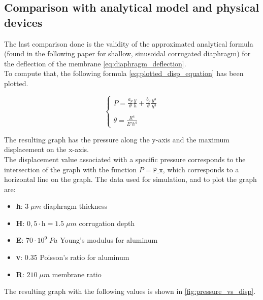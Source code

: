 \subsection{Comparison with analytical model and physical devices}

The last comparison done is the validity of the approximated analytical formula (found in the following paper \cite[p.~988-989]{jerman1986} for shallow, sinusoidal corrugated diaphragm) for the deflection of the membrane \cref{eq:diaphragm_deflection}. \\
To compute that, the following formula \cref{eq:plotted_disp_equation} has been plotted.

\begin{equation}
     \begin{cases}
        P = \frac{a_p}{\theta} \frac{y}{h} + \frac{b_p}{\theta} \frac{y^3}{h^3} \\
        \\
        \theta = \frac{R^4}{E'h^4}
    \end{cases}
    \label{eq:plotted_disp_equation}
\end{equation}

\noindent
The resulting graph has the pressure along the y-axis and the maximum displacement on the x-axis. \\
The displacement value associated with a specific pressure corresponds to the intersection of the graph with the function \(P=\texttt{P\_x}\), which corresponds to a horizontal line on the graph.
The data used for simulation, and to plot the graph are:

\begin{itemize}
    \item \textbf{h}: \(3 \; \mu m\) diaphragm thickness
    \item \textbf{H}: \(0,5 \cdot \text{h} = 1.5 \; \mu m\) corrugation depth
    \item \textbf{E}: \(70 \cdot 10^9 \; Pa\) Young's modulus for aluminum
    \item \textbf{v}: \(0.35\) Poisson's ratio for aluminum
    \item \textbf{R}: \(210 \; \mu m\) membrane ratio
\end{itemize}

\noindent
The resulting graph with the following values is shown in \autoref{fig:pressure_vs_disp}.

